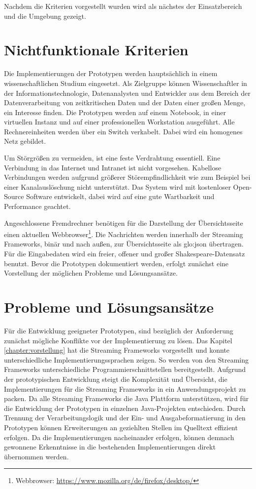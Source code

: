 Nachdem die Kriterien vorgestellt wurden wird als nächstes der Einsatzbereich und die Umgebung gezeigt.


\section{Nichtfunktionale Kriterien}
\label{sec:nichtFunktAnforderung}

Die Implementierungen der Prototypen werden hauptsächlich in einem wissenschaftlichen Studium eingesetzt. Als Zielgruppe können Wissenschaftler in der Informationstechnologie, Datenanalysten und Entwickler aus dem Bereich der Datenverarbeitung von zeitkritischen Daten und der Daten einer großen Menge, ein Interesse finden. Die Prototypen werden auf einem Notebook, in einer virtuellen Instanz und auf einer professionellen Workstation ausgeführt. Alle Rechnereinheiten werden über ein Switch verkabelt. Dabei wird ein homogenes Netz gebildet. 

Um Störgrößen zu vermeiden, ist eine feste Verdrahtung essentiell. Eine  Verbindung in das Internet und Intranet ist nicht vorgesehen. Kabellose Verbindungen werden aufgrund größerer Störempfindlichkeit wie zum Beispiel bei einer Kanalauslöschung nicht unterstützt. Das System wird mit kostenloser Open-Source Software entwickelt, dabei wird auf eine gute Wartbarkeit und Performance geachtet.

Angeschlossene Fremdrechner benötigen für die Darstellung der Übersichtsseite einen aktuellen Webbrowser\footnote{Webbrowser: \url{https://www.mozilla.org/de/firefox/desktop/}}. Die Nachrichten werden innerhalb der Streaming Frameworks, binär und nach außen, zur Übersichtsseite als \gls{glo:json} übertragen. Für die Eingabedaten wird ein freier, offener und großer Shakespeare-Datensatz  benutzt. Bevor die Prototypen dokumentiert werden, erfolgt zunächst eine Vorstellung der möglichen Probleme und Lösungsansätze.


\section{Probleme und Lösungsansätze}
\label{sec:loesungsansatz}

Für die Entwicklung geeigneter Prototypen, sind bezüglich der Anforderung zunächst mögliche Konflikte vor der Implementierung zu lösen. Das Kapitel \ref{chapter:vorstellung} hat die Streaming Frameworks vorgestellt und konnte unterschiedliche Implementierungssprachen zeigen. So werden von den Streaming Frameworks unterschiedliche Programmierschnittstellen bereitgestellt. Aufgrund der prototypischen Entwicklung steigt die Komplexität und Übersicht, die Implementierungen für die Streaming Frameworks in ein Anwendungsprojekt zu packen. Da alle Streaming Frameworks die Java Plattform unterstützen, wird für die Entwicklung der Prototypen in einzelnen Java-Projekten entschieden. Durch Trennung der Verarbeitungslogik und der Ein- und Ausgabeformatierung in den Prototypen können Erweiterungen an geziehlten Stellen im Quelltext effizient erfolgen. Da die Implementierungen nacheinander erfolgen, können demnach gewonnene Erkenntnisse in die bestehenden Implementierungen direkt übernommen werden. 

